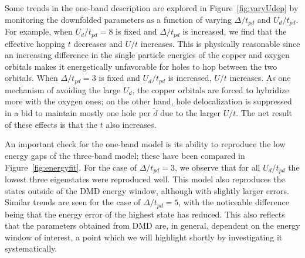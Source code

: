 Some trends in the one-band description are explored in Figure~\ref{fig:varyUdep} 
by monitoring the downfolded parameters as a function of varying $\Delta/t_{pd}$ and $U_d/t_{pd}$. 
For example, when $U_d/t_{pd}=8$ is fixed and $\Delta/t_{pd}$ is increased, we find that 
the effective hopping $t$ decreases and $U/t$ increases. This is physically reasonable since an increasing difference in the 
single particle energies of the copper and oxygen orbitals makes it energetically unfavorable for holes 
to hop between the two orbitals. When $\Delta/t_{pd}=3$ is fixed and $U_d/t_{pd}$ is increased, $U/t$ increases. 
As one mechanism of avoiding the large $U_d$, the copper orbitals are forced to hybridize more with the oxygen ones; 
on the other hand, hole delocalization is suppressed in a bid to maintain mostly one hole per $\tilde{d}$ due to the larger 
$U/t$. The net result of these effects is that the $t$ also increases.%

An important check for the one-band model is its ability to reproduce the low energy gaps of the three-band model; these have been compared in Figure~\ref{fig:energyfit}. 
For the case of $\Delta/t_{pd}=3$, we observe that for all $U_d/t_{pd}$ the lowest three eigenstates were reproduced well. 
This model also reproduces the states outside of the DMD energy window, although with slightly larger errors. 
Similar trends are seen for the case of $\Delta/t_{pd}=5$, 
with the noticeable difference being that the energy error of the highest state has reduced. 
This also reflects that the parameters obtained from DMD are, in general, dependent on the energy window of interest, a 
point which we will highlight shortly by investigating it systematically. 

